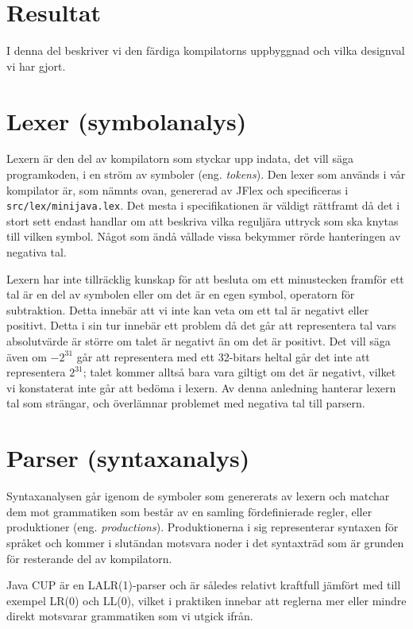 \documentclass[a4paper,11pt]{article}
\newcommand{\trans}[2][eng.]{(#1 \emph{#2})}
\renewcommand{\*}[0]{\cdot}
\begin{document}
\section*{Resultat}

I denna del beskriver vi den färdiga kompilatorns uppbyggnad och vilka
designval vi har gjort.

\section*{Lexer (symbolanalys)}

Lexern är den del av kompilatorn som styckar upp indata, det vill säga
programkoden, i en ström av symboler \trans{tokens}. Den lexer som används i
vår kompilator är, som nämnts ovan, genererad av JFlex och specificeras i
\texttt{src/lex/minijava.lex}. Det mesta i specifikationen är väldigt rättframt
då det i stort sett endast handlar om att beskriva vilka reguljära uttryck som
ska knytas till vilken symbol. Något som ändå vållade vissa bekymmer rörde
hanteringen av negativa tal.

Lexern har inte tillräcklig kunskap för att besluta om ett minustecken framför
ett tal är en del av symbolen eller om det är en egen symbol, operatorn för
subtraktion. Detta innebär att vi inte kan veta om ett tal är negativt eller
positivt. Detta i sin tur innebär ett problem då det går att representera tal
vars absolutvärde är större om talet är negativt än om det är positivt. Det
vill säga även om $-2^{31}$ går att representera med ett 32-bitars heltal går
det inte att representera $2^{31}$; talet kommer alltså bara vara giltigt om
det är negativt, vilket vi konstaterat inte går att bedöma i lexern. Av denna
anledning hanterar lexern tal som strängar, och överlämnar problemet med
negativa tal till parsern.

\section*{Parser (syntaxanalys)}

Syntaxanalysen går igenom de symboler som genererats av lexern och matchar dem
mot grammatiken som består av en samling fördefinierade regler, eller
produktioner \trans{productions}. Produktionerna i sig representerar syntaxen
för språket och kommer i slutändan motsvara noder i det syntaxträd som är
grunden för resterande del av kompilatorn.

Java CUP är en LALR(1)-parser och är således relativt kraftfull jämfört med
till exempel LR(0) och LL(0), vilket i praktiken innebar att reglerna mer eller
mindre direkt motsvarar grammatiken som vi utgick ifrån.
\end{document}
